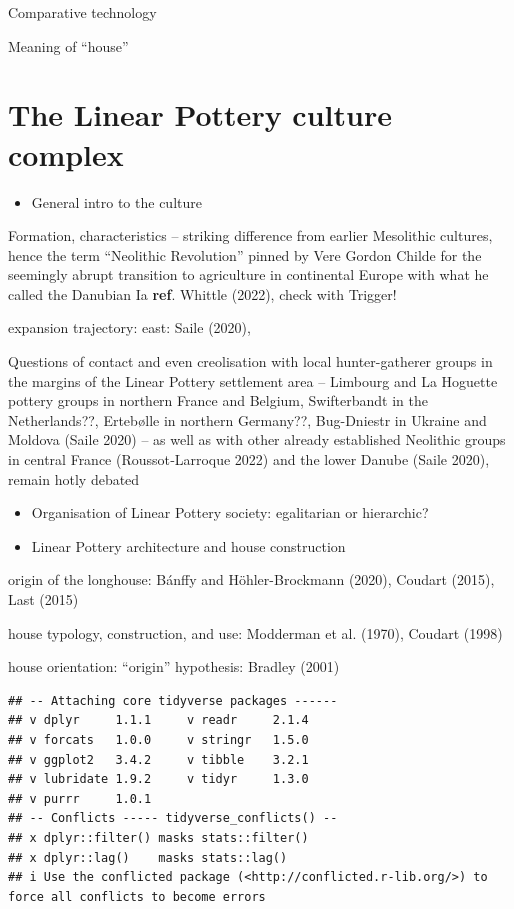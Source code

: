 \documentclass[
  12pt,
]{book}
\providecommand{\tightlist}{%
  \setlength{\itemsep}{0pt}\setlength{\parskip}{0pt}}
\begin{document}
Comparative technology

Meaning of ``house''

\hypertarget{lbk}{%
\section{The Linear Pottery culture complex}\label{lbk}}

\begin{itemize}
\tightlist
\item
  General intro to the culture
\end{itemize}

Formation, characteristics -- striking difference from earlier Mesolithic cultures, hence the term ``Neolithic Revolution'' pinned by Vere Gordon Childe for the seemingly abrupt transition to agriculture in continental Europe with what he called the Danubian Ia \textbf{ref}. Whittle (2022), check with Trigger!

expansion trajectory: east: Saile (2020),

Questions of contact and even creolisation with local hunter-gatherer groups in the margins of the Linear Pottery settlement area -- Limbourg and La Hoguette pottery groups in northern France and Belgium, Swifterbandt in the Netherlands??, Ertebølle in northern Germany??, Bug-Dniestr in Ukraine and Moldova (Saile 2020) -- as well as with other already established Neolithic groups in central France (Roussot‑Larroque 2022) and the lower Danube (Saile 2020), remain hotly debated

\begin{itemize}
\tightlist
\item
  Organisation of Linear Pottery society: egalitarian or hierarchic?
\item
  Linear Pottery architecture and house construction
\end{itemize}

origin of the longhouse: Bánffy and Höhler-Brockmann (2020), Coudart (2015), Last (2015)

house typology, construction, and use: Modderman et al. (1970), Coudart (1998)

house orientation: ``origin'' hypothesis: Bradley (2001)

\begin{verbatim}
## -- Attaching core tidyverse packages ------
## v dplyr     1.1.1     v readr     2.1.4
## v forcats   1.0.0     v stringr   1.5.0
## v ggplot2   3.4.2     v tibble    3.2.1
## v lubridate 1.9.2     v tidyr     1.3.0
## v purrr     1.0.1     
## -- Conflicts ----- tidyverse_conflicts() --
## x dplyr::filter() masks stats::filter()
## x dplyr::lag()    masks stats::lag()
## i Use the conflicted package (<http://conflicted.r-lib.org/>) to force all conflicts to become errors
\end{verbatim}
\end{document}
